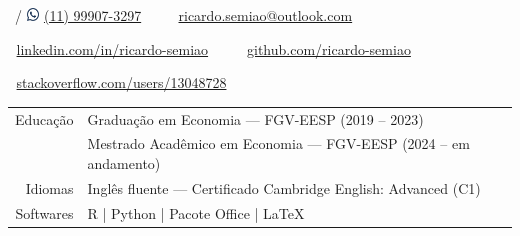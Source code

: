 \documentclass[11pt,letterpaper]{article}
\begin{document}

\noindent\begin{minipage}[c]{\textwidth} \centering
\faPhone\ / \includegraphics[width=0.9em]{whatsapp.png} \href{https://api.whatsapp.com/send?phone=5511999073297}{(11) 99907-3297} $\;$ \textbullet $\;$ $\;$ \faEnvelopeO\ \href{mailto:ricardo.semiao@outlook.com}{ricardo.semiao@outlook.com}

\faLinkedin $\;$ \href{https://linkedin.com/in/ricardo-semiao}{linkedin.com/in/ricardo-semiao} $\;$ \textbullet $\;$ $\;$ \faGithub $\;$ \href{https://github.com/ricardo-semiao}{github.com/ricardo-semiao}

\faStackOverflow $\;$ \href{https://stackoverflow.com/users/13048728}{stackoverflow.com/users/13048728}
\end{minipage} \par\vspace{0.5cm}


\vspace{-0.5cm}
\begin{tabular}{rl}
Educação & Graduação em Economia --- FGV-EESP (2019 -- 2023)\\[0.3cm]
 & Mestrado Acadêmico em Economia --- FGV-EESP (2024 -- em andamento)\\[0.3cm]
Idiomas & Inglês fluente --- Certificado Cambridge English: Advanced (C1)\\[0.3cm]
Softwares & R | Python | Pacote Office | LaTeX %
\end{tabular}
\end{document}
